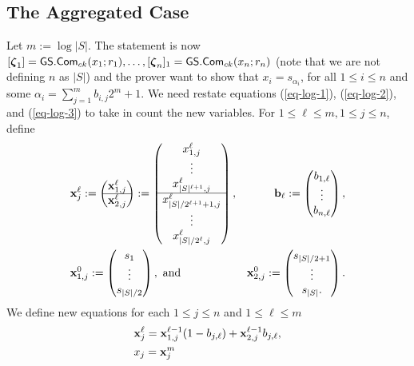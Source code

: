 \subsection{The Aggregated Case}
Let $m:=\log |S|$. The statement is now $[{\boldsymbol \zeta}_1]={\mathsf{GS}}.\mathsf{Com}_{ck}(x_1;r_1),\ldots,[{\boldsymbol \zeta}_n]_1={\mathsf{GS}}.\mathsf{Com}_{ck}(x_n;r_n)$ (note that we are not defining $n$ as $|S|$) and the prover want to show that $x_i=s_{\alpha_i}$, for all $1\leq i\leq n$ and some $\alpha_i=\sum_{j=1}^m b_{i,j}2^m+1$. We need restate equations (\ref{eq-log-1}), (\ref{eq-log-2}), and (\ref{eq-log-3}) to take in count the new variables. For $1\leq \ell\leq m,1\leq j\leq n$, define
\begin{align*}
&\mathbf{x}_j^\ell:=
\begin{pmatrix}
\mathbf{x}^\ell_{1,j}\\
\hline
\mathbf{x}^\ell_{2,j}
\end{pmatrix}
:=
\begin{pmatrix}
x^\ell_{1,j}\\\vdots\\x^\ell_{|S|^{\ell+1},j}\\
\hline
x^\ell_{|S|/2^{\ell+1}+1,j}\\\vdots\\x^\ell_{|S|/2^\ell,j}
\end{pmatrix},
&\mathbf{b}_\ell := 
\begin{pmatrix}
b_{1,\ell}\\\vdots\\b_{n,\ell}
\end{pmatrix},\\
&\mathbf{x}_{1,j}^0 := \begin{pmatrix}
s_1\\\vdots\\s_{|S|/2}
\end{pmatrix},\text{ and }
&\mathbf{x}_{2,j}^0 := \begin{pmatrix}
s_{|S|/2+1}\\\vdots\\s_{|S|}.
\end{pmatrix}.
\end{align*}
We define new equations for each $1\leq j\leq n$ and $1\leq \ell \leq m$
\begin{align}
&\mathbf{x}^\ell_j=\mathbf{x}^{\ell-1}_{1,j}({1}-{b}_{j,\ell})+\mathbf{x}^{\ell-1}_{2,j}{b}_{j,\ell},\label{eq-alog-1}\\
&x_j= \mathbf{x}_{j}^m\label{eq-alog-1}
\end{align}

